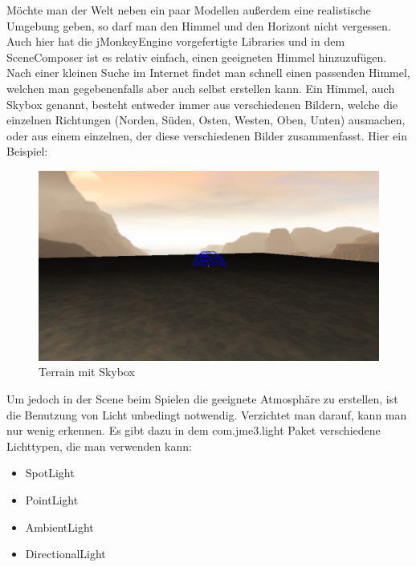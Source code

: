 Möchte man der Welt neben ein paar Modellen außerdem eine realistische Umgebung geben, so darf man den Himmel und den Horizont nicht vergessen. Auch hier hat die jMonkeyEngine vorgefertigte Libraries und in dem SceneComposer ist es relativ einfach, einen geeigneten Himmel hinzuzufügen. Nach einer kleinen Suche im Internet findet man schnell einen passenden Himmel, welchen man gegebenenfalls aber auch selbst erstellen kann. Ein Himmel, auch Skybox genannt, besteht entweder immer aus verschiedenen Bildern, welche die einzelnen Richtungen (Norden, Süden, Osten, Westen, Oben, Unten) ausmachen, oder aus einem einzelnen, der diese verschiedenen Bilder zusammenfasst. Hier ein Beispiel:
\begin{center}
	\begin{figure}[h!]
		
		
		\caption{Terrain mit Skybox}
		
		\includegraphics[width=.8\linewidth]{images/Skybox} 
		
	\end{figure}  
\end{center}


Um jedoch in der Scene beim Spielen die geeignete Atmosphäre zu erstellen, ist die Benutzung von Licht unbedingt notwendig. Verzichtet man darauf, kann man nur wenig erkennen. Es gibt dazu in dem com.jme3.light Paket verschiedene Lichttypen, die man verwenden kann:
\begin{itemize}
	\item SpotLight
	\item PointLight
	\item AmbientLight
	\item DirectionalLight
\end{itemize}

